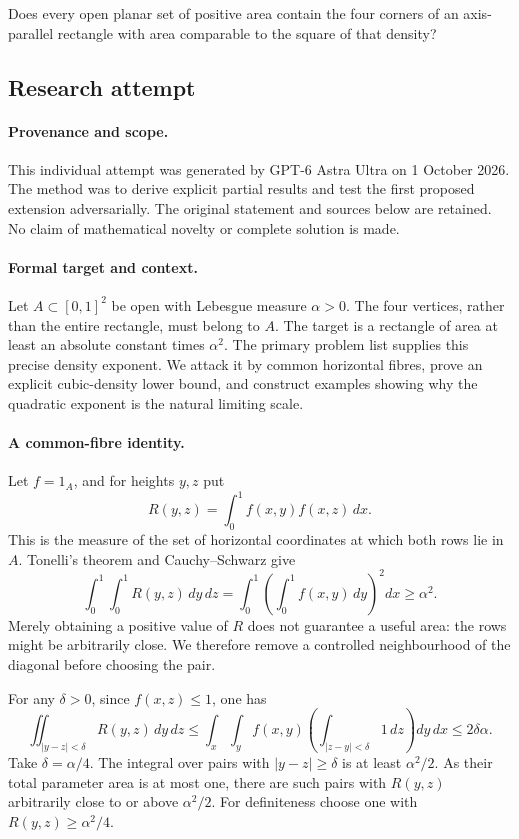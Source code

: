 \documentclass[11pt,a4paper]{article}
\begin{document}
Does every open planar set of positive area contain the four corners of an axis-parallel rectangle with area comparable to the square of that density?

\subsection{Research attempt}

\paragraph{Provenance and scope.}
This individual attempt was generated by GPT-6 Astra Ultra on 1 October 2026. The method was to derive explicit partial results and test the first proposed extension adversarially. The original statement and sources below are retained. No claim of mathematical novelty or complete solution is made.

\paragraph{Formal target and context.}
Let $A\subset[0,1]^2$ be open with Lebesgue measure $\alpha>0$. The four vertices, rather than the entire rectangle, must belong to $A$. The target is a rectangle of area at least an absolute constant times $\alpha^2$. The primary problem list supplies this precise density exponent. We attack it by common horizontal fibres, prove an explicit cubic-density lower bound, and construct examples showing why the quadratic exponent is the natural limiting scale.

\paragraph{A common-fibre identity.}
Let $f=1_A$, and for heights $y,z$ put
\[
 R(y,z)=\int_0^1f(x,y)f(x,z)\,dx.
\]
This is the measure of the set of horizontal coordinates at which both rows lie in $A$. Tonelli's theorem and Cauchy--Schwarz give
\[
 \int_0^1\int_0^1 R(y,z)\,dy\,dz
 =\int_0^1\left(\int_0^1 f(x,y)\,dy\right)^2dx\geq\alpha^2.
\]
Merely obtaining a positive value of $R$ does not guarantee a useful area: the rows might be arbitrarily close. We therefore remove a controlled neighbourhood of the diagonal before choosing the pair.

For any $\delta>0$, since $f(x,z)\leq1$, one has
\[
 \iint_{|y-z|<\delta}R(y,z)\,dy\,dz
 \leq\int_x\int_y f(x,y)\left(\int_{|z-y|<\delta}1\,dz\right)dy\,dx
 \leq2\delta\alpha.
\]
Take $\delta=\alpha/4$. The integral over pairs with $|y-z|\geq\delta$ is at least $\alpha^2/2$. As their total parameter area is at most one, there are such pairs with $R(y,z)$ arbitrarily close to or above $\alpha^2/2$. For definiteness choose one with $R(y,z)\geq\alpha^2/4$.
\end{document}
